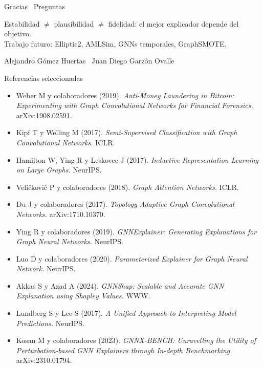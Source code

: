 \documentclass[aspectratio=169,11pt]{beamer}
\begin{document}
\begin{frame}[standout]
Gracias \textperiodcentered\ Preguntas
\vspace{0.5em}

{\small\color{greytx} Estabilidad $\neq$ plausibilidad $\neq$ fidelidad: el mejor explicador depende del objetivo.\\
Trabajo futuro: Elliptic2, AMLSim, GNNs temporales, GraphSMOTE.}
\vspace{0.5em}

{\footnotesize\color{muted} Alejandro Gómez Huertas \textperiodcentered\ Juan Diego Garzón Ovalle}
\end{frame}

\appendix

\begin{frame}[allowframebreaks]{Referencias seleccionadas}
\scriptsize
\begin{itemize}
  \item Weber M y colaboradores (2019). \emph{Anti-Money Laundering in Bitcoin: Experimenting with Graph Convolutional Networks for Financial Forensics.} arXiv:1908.02591.
  \item Kipf T y Welling M (2017). \emph{Semi-Supervised Classification with Graph Convolutional Networks.} ICLR.
  \item Hamilton W, Ying R y Leskovec J (2017). \emph{Inductive Representation Learning on Large Graphs.} NeurIPS.
  \item Veličković P y colaboradores (2018). \emph{Graph Attention Networks.} ICLR.
  \item Du J y colaboradores (2017). \emph{Topology Adaptive Graph Convolutional Networks.} arXiv:1710.10370.
  \item Ying R y colaboradores (2019). \emph{GNNExplainer: Generating Explanations for Graph Neural Networks.} NeurIPS.
  \item Luo D y colaboradores (2020). \emph{Parameterized Explainer for Graph Neural Network.} NeurIPS.
  \item Akkas S y Azad A (2024). \emph{GNNShap: Scalable and Accurate GNN Explanation using Shapley Values.} WWW.
  \item Lundberg S y Lee S (2017). \emph{A Unified Approach to Interpreting Model Predictions.} NeurIPS.
  \item Kosan M y colaboradores (2023). \emph{GNNX-BENCH: Unravelling the Utility of Perturbation-based GNN Explainers through In-depth Benchmarking.} arXiv:2310.01794.

\end{itemize}
\end{frame}
\end{document}
